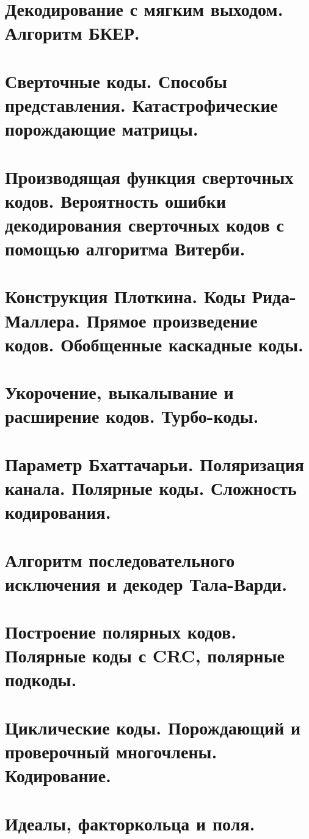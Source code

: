 \documentclass{article}
\newcommand\0{\mathbb{0}}
\newcommand\1{\mathbb{1}}
\begin{document}
\section{Декодирование с мягким выходом. Алгоритм БКЕР.}

\section{Сверточные коды. Способы представления. Катастрофические порождающие матрицы.}

\section{Производящая функция сверточных кодов. Вероятность ошибки декодирования сверточных кодов с помощью алгоритма Витерби.}

\section{Конструкция Плоткина. Коды Рида-Маллера. Прямое произведение кодов. Обобщенные каскадные коды.}

\section{Укорочение, выкалывание и расширение кодов. Турбо-коды.}

\section{Параметр Бхаттачарьи. Поляризация канала. Полярные коды. Сложность кодирования.}

\section{Алгоритм последовательного исключения и декодер Тала-Варди.}

\section{Построение полярных кодов. Полярные коды с CRC, полярные подкоды.}

\section{Циклические коды. Порождающий и проверочный многочлены. Кодирование.}

\section{Идеалы, факторкольца и поля.}
\end{document}
